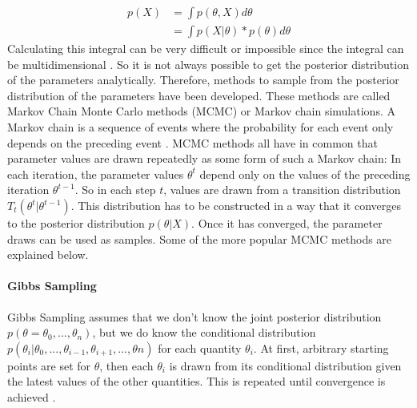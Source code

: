 \documentclass{article}
\begin{document}
\begin{equation}
\begin{split}
p(X) &= \int p(\theta,X) d \theta \\
&=  \int p(X|\theta) * p(\theta) d \theta
\end{split}
\end{equation}
Calculating this integral can be very difficult or impossible since the integral can be multidimensional \cite{1439840954}. So it is not always possible to get the posterior distribution of the parameters analytically. Therefore, methods to sample from the posterior distribution of the parameters have been developed. These methods are called Markov Chain Monte Carlo methods (MCMC) or Markov chain simulations. A Markov chain is a sequence of events where the probability for each event only depends on the preceding event \cite{Oxforddictionaries}. MCMC methods all have in common that parameter values are drawn repeatedly as some form of such a Markov chain: In each iteration, the parameter values $\theta^t$ depend only on the values of the preceding iteration $\theta^{t-1}$. So in each step $t$, values are drawn from a transition distribution $T_t(\theta^t|\theta^{t-1})$. This distribution has to be constructed in a way that it converges to the posterior distribution $p(\theta|X)$. Once it has converged, the parameter draws can be used as samples. Some of the more popular MCMC methods are explained below.
\paragraph{Gibbs Sampling}
Gibbs Sampling assumes that we don't know the joint posterior distribution $p(\theta = \theta_0,...,\theta_n)$, but we do know the conditional distribution $p(\theta_i | \theta_0,...,\theta_{i-1},\theta_{i+1},...,\theta{n} )$ for each quantity $\theta_i$. At first, arbitrary starting points are set for $\theta$, then each $\theta_i$ is drawn from its conditional distribution given the latest values of the other quantities. This is repeated until convergence is achieved
\cite{Martz1994}.
\end{document}
